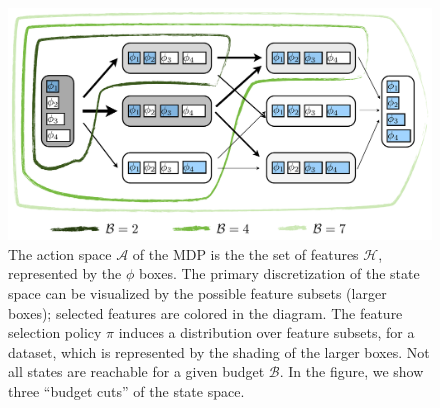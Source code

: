 \begin{figure}[ht]
\centering
\includegraphics[width=1\linewidth]{../../figures/mdp_masks.pdf}
\caption{
The action space $\mathcal{A}$ of the MDP is the the set of features $\mathcal{H}$, represented by the $\phi$ boxes.
The primary discretization of the state space can be visualized by the possible feature subsets (larger boxes); selected features are colored in the diagram.
The feature selection policy $\pi$ induces a distribution over feature subsets, for a dataset, which is represented by the shading of the larger boxes.
Not all states are reachable for a given budget $\mathcal{B}$.
In the figure, we show three ``budget cuts'' of the state space.
\label{fig:state_space}
}
\end{figure}

